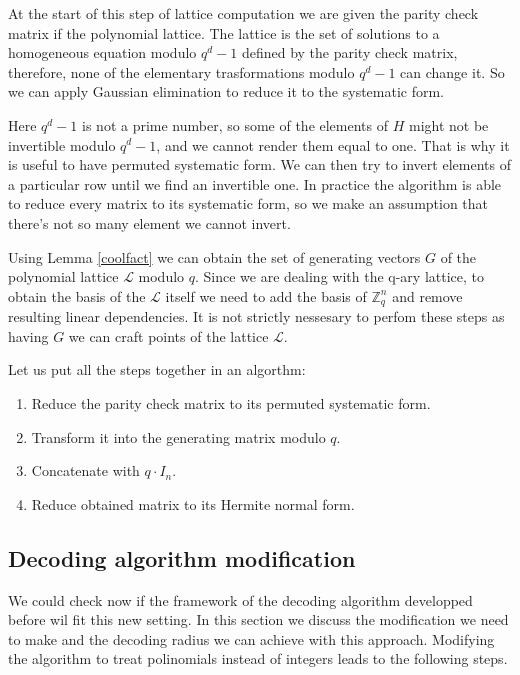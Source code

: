 \documentclass[12pt]{article}
\newcommand{\ZZ}{\mathbb{Z}}
\newcommand{\LL}{\mathcal{L}}
\begin{document}
At the start of this step of lattice computation we are given the parity check matrix if the polynomial lattice. The lattice is the set of solutions to a homogeneous equation modulo $q^{d} -1$ defined by the parity check matrix, therefore, none of the elementary trasformations modulo $q^{d} -1$ can change it. So we can apply Gaussian elimination to reduce it to the systematic form.

Here $q^{d} -1$ is not a prime number, so some of the elements of $H$ might not be invertible modulo $q^{d} -1$, and we cannot render them equal to one. That is why it is useful to have permuted systematic form. We can then try to invert elements of a particular row until we find an invertible one. In practice the algorithm is able to reduce every matrix to its systematic form, so we make an assumption that there's not so many element we cannot invert.

Using Lemma \ref{coolfact} we can obtain the set of generating vectors $G$ of the polynomial lattice $\LL$ modulo $q$. Since we are dealing with the q-ary lattice, to obtain the basis of the $\LL$ itself we need to add the basis of $\ZZ^{n}_{q}$ and remove resulting linear dependencies. It is not strictly nessesary to perfom these steps as having $G$ we can craft points of the lattice $\LL$.

Let us put all the steps together in an algorthm:
\begin{enumerate}
    \item Reduce the parity check matrix to its permuted systematic form.
    \item Transform it into the generating matrix modulo $q$.
    \item Concatenate with $q \cdot I_{n}$.
    \item Reduce obtained matrix to its Hermite normal form.
\end{enumerate}


\subsection{Decoding algorithm modification}
\label{subsec:decoding_polynomials}

We could check now if the framework of the decoding algorithm developped before wil fit this new setting. In this section we discuss the modification we need to make and the decoding radius we can achieve with this approach. Modifying the algorithm to treat polinomials instead of integers leads to the following steps.
\end{document}
